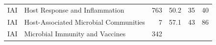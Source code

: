 \documentclass[11pt,]{article}
\begin{document}
\begin{longtable}[]{@{}llrrrr@{}}
\begin{minipage}[t]{0.06\columnwidth}\raggedright\strut
IAI\strut
\end{minipage} & \begin{minipage}[t]{0.43\columnwidth}\raggedright\strut
Host Response and Inflammation\strut
\end{minipage} & \begin{minipage}[t]{0.04\columnwidth}\raggedleft\strut
763\strut
\end{minipage} & \begin{minipage}[t]{0.08\columnwidth}\raggedleft\strut
50.2\strut
\end{minipage} & \begin{minipage}[t]{0.11\columnwidth}\raggedleft\strut
35\strut
\end{minipage} & \begin{minipage}[t]{0.11\columnwidth}\raggedleft\strut
40\strut
\end{minipage}\tabularnewline
\begin{minipage}[t]{0.06\columnwidth}\raggedright\strut
IAI\strut
\end{minipage} & \begin{minipage}[t]{0.43\columnwidth}\raggedright\strut
Host-Associated Microbial Communities\strut
\end{minipage} & \begin{minipage}[t]{0.04\columnwidth}\raggedleft\strut
7\strut
\end{minipage} & \begin{minipage}[t]{0.08\columnwidth}\raggedleft\strut
57.1\strut
\end{minipage} & \begin{minipage}[t]{0.11\columnwidth}\raggedleft\strut
43\strut
\end{minipage} & \begin{minipage}[t]{0.11\columnwidth}\raggedleft\strut
86\strut
\end{minipage}\tabularnewline
\begin{minipage}[t]{0.06\columnwidth}\raggedright\strut
IAI\strut
\end{minipage} & \begin{minipage}[t]{0.43\columnwidth}\raggedright\strut
Microbial Immunity and Vaccines\strut
\end{minipage} & \begin{minipage}[t]{0.04\columnwidth}\raggedleft\strut
342\strut
\end{minipage} & \begin{minipage}[t]{0.08\columnwidth}\raggedleft\strut

\end{minipage}
\end{longtable}
\end{document}

